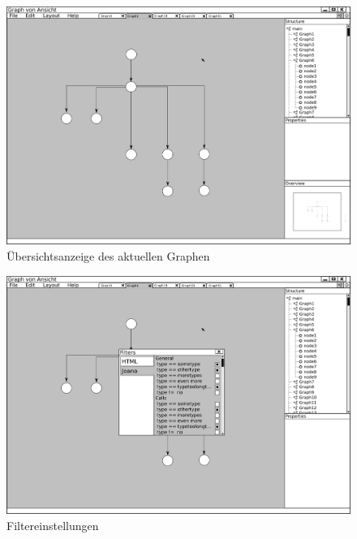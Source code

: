 \begin{figure}[ht]
  \centering
  \includegraphics[width=380pt]{resourcen/gui_view_minimap.png}
  \caption{Übersichtsanzeige des aktuellen Graphen}
  \label{fig:gui_view_minimap}
\end{figure}

\begin{figure}[ht]
  \centering
  \includegraphics[width=380pt]{resourcen/gui_window_filters.png}
  \caption{Filtereinstellungen}
  \label{fig:gui_window_filters}
\end{figure}

